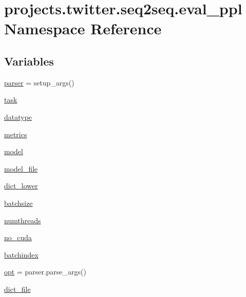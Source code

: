 \hypertarget{namespaceprojects_1_1twitter_1_1seq2seq_1_1eval__ppl}{}\section{projects.\+twitter.\+seq2seq.\+eval\+\_\+ppl Namespace Reference}
\label{namespaceprojects_1_1twitter_1_1seq2seq_1_1eval__ppl}
\subsection*{Variables}
\begin{DoxyCompactItemize}
\item 
\hyperlink{namespaceprojects_1_1twitter_1_1seq2seq_1_1eval__ppl_a58de09ffe0e977c1b7e34dde79ea71ce}{parser} = setup\+\_\+args()
\item 
\hyperlink{namespaceprojects_1_1twitter_1_1seq2seq_1_1eval__ppl_a68ab0d0170b8f5d5eaee4f933b8b7640}{task}
\item 
\hyperlink{namespaceprojects_1_1twitter_1_1seq2seq_1_1eval__ppl_a6963271d88f5f2e169382883e1803158}{datatype}
\item 
\hyperlink{namespaceprojects_1_1twitter_1_1seq2seq_1_1eval__ppl_ae591212e77874eeef460de9d3e73c40b}{metrics}
\item 
\hyperlink{namespaceprojects_1_1twitter_1_1seq2seq_1_1eval__ppl_a957ad68eeb80ae62a16b997dbd7c4228}{model}
\item 
\hyperlink{namespaceprojects_1_1twitter_1_1seq2seq_1_1eval__ppl_a3581d64c392393e1c845011552cc5044}{model\+\_\+file}
\item 
\hyperlink{namespaceprojects_1_1twitter_1_1seq2seq_1_1eval__ppl_a7cffe03cb1131a93d7e8f99efbbb0180}{dict\+\_\+lower}
\item 
\hyperlink{namespaceprojects_1_1twitter_1_1seq2seq_1_1eval__ppl_ae5ba2a95bcfac4763cc3fae49c954f78}{batchsize}
\item 
\hyperlink{namespaceprojects_1_1twitter_1_1seq2seq_1_1eval__ppl_a0b0aa04b4b36bc75ad6ee018d2da4533}{numthreads}
\item 
\hyperlink{namespaceprojects_1_1twitter_1_1seq2seq_1_1eval__ppl_a80313b03835229ac187a2ba372d794bb}{no\+\_\+cuda}
\item 
\hyperlink{namespaceprojects_1_1twitter_1_1seq2seq_1_1eval__ppl_aec0204ef721b0bd41fb245129495429f}{batchindex}
\item 
\hyperlink{namespaceprojects_1_1twitter_1_1seq2seq_1_1eval__ppl_a94d21f9fb493bc113066eb0fb91ef244}{opt} = parser.\+parse\+\_\+args()
\item 
\hyperlink{namespaceprojects_1_1twitter_1_1seq2seq_1_1eval__ppl_aeb65d54dbb519e3f783fca6b64f5a28c}{dict\+\_\+file}
\end{DoxyCompactItemize}


